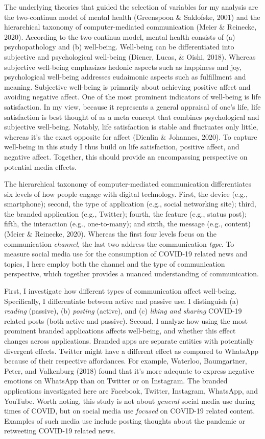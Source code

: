 \documentclass[
  english,
  man,floatsintext]{apa6}
\begin{document}
The underlying theories that guided the selection of variables for my analysis are the two-continua model of mental health (Greenspoon \& Saklofske, 2001) and the hierarchical taxonomy of computer-mediated communication (Meier \& Reinecke, 2020).
According to the two-continua model, mental health consists of (a) psychopathology and (b) well-being.
Well-being can be differentiated into subjective and psychological well-being (Diener, Lucas, \& Oishi, 2018).
Whereas subjective well-being emphasizes hedonic aspects such as happiness and joy, psychological well-being addresses eudaimonic aspects such as fulfillment and meaning.
Subjective well-being is primarily about achieving positive affect and avoiding negative affect.
One of the most prominent indicators of well-being is life satisfaction.
In my view, because it represents a general appraisal of one's life, life satisfaction is best thought of as a meta concept that combines psychological and subjective well-being.
Notably, life satisfaction is stable and fluctuates only little, whereas it's the exact opposite for affect (Dienlin \& Johannes, 2020).
To capture well-being in this study I thus build on life satisfaction, positive affect, and negative affect.
Together, this should provide an encompassing perspective on potential media effects.

The hierarchical taxonomy of computer-mediated communication differentiates six levels of how people engage with digital technology.
First, the device (e.g., smartphone); second, the type of application (e.g., social networking site); third, the branded application (e.g., Twitter); fourth, the feature (e.g., status post); fifth, the interaction (e.g., one-to-many); and sixth, the message (e.g., content) (Meier \& Reinecke, 2020).
Whereas the first four levels focus on the communication \emph{channel}, the last two address the communication \emph{type}.
To measure social media use for the consumption of COVID-19 related news and topics, I here employ both the channel and the type of communication perspective, which together provides a nuanced understanding of communication.

First, I investigate how different types of communication affect well-being.
Specifically, I differentiate between active and passive use.
I distinguish (a) \emph{reading} (passive), (b) \emph{posting} (active), and (c) \emph{liking and sharing} COVID-19 related posts (both active and passive).
Second, I analyze how using the most prominent branded applications affects well-being, and whether this effect changes across applications.
Branded apps are separate entities with potentially divergent effects.
Twitter might have a different effect as compared to WhatsApp because of their respective affordances.
For example, Waterloo, Baumgartner, Peter, and Valkenburg (2018) found that it's more adequate to express negative emotions on WhatsApp than on Twitter or on Instagram.
The branded applications investigated here are Facebook, Twitter, Instagram, WhatsApp, and YouTube.
Worth noting, this study is not about \emph{general} social media use during times of COVID, but on social media use \emph{focused} on COVID-19 related content.
Examples of such media use include posting thoughts about the pandemic or retweeting COVID-19 related news.
\end{document}
